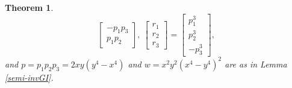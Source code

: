 \documentclass[10pt,a4paper]{amsart}
\newtheorem{theorem}{Theorem}
\begin{document}
\begin{theorem}
\begin{equation*}
\begin{bmatrix}
            -p_1p_3 \\
            p_1p_2
        \end{bmatrix}, \:
        \begin{bmatrix}
            r_1 \\
            r_2 \\
            r_3
        \end{bmatrix}
        =
        \begin{bmatrix}
            p_1^3 \\
            p_2^3 \\
            -p_3^3
        \end{bmatrix},
    \end{equation*}
    and \(p = p_1p_2p_3 = 2xy(y^4-x^4)\) and \(w = x^2y^2(x^4-y^4)^2\) are as in Lemma \ref{semi-invGI}. 
\end{theorem}
\end{document}

